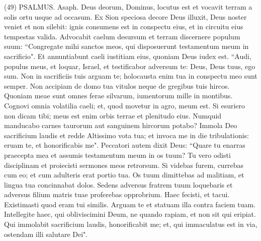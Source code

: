 \begin{biblechapter}  (49) 
\verse  PSALMUS. Asaph. Deus deorum, Dominus, locutus est et vocavit terram a solis ortu usque ad occasum. 
\verse Ex Sion speciosa decore Deus illuxit, 
\verse Deus noster veniet et non silebit: ignis consumens est in conspectu eius, et in circuitu eius tempestas valida. 
\verse Advocabit caelum desursum et terram discernere populum suum: 
\verse “Congregate mihi sanctos meos, qui disposuerunt testamentum meum in sacrificio". 
\verse Et annuntiabunt caeli iustitiam eius, quoniam Deus iudex est. 
\verse “Audi, populus meus, et loquar, Israel, et testificabor adversum te: Deus, Deus tuus, ego sum. 
\verse Non in sacrificiis tuis arguam te; holocausta enim tua in conspectu meo sunt semper. 
\verse Non accipiam de domo tua vitulos neque de gregibus tuis hircos. 
\verse Quoniam meae sunt omnes ferae silvarum, iumentorum mille in montibus. 
\verse Cognovi omnia volatilia caeli; et, quod movetur in agro, meum est. 
\verse Si esuriero non dicam tibi; meus est enim orbis terrae et plenitudo eius. 
\verse Numquid manducabo carnes taurorum aut sanguinem hircorum potabo? 
\verse Immola Deo sacrificium laudis et redde Altissimo vota tua; 
\verse et invoca me in die tribulationis: eruam te, et honorificabis me". 
\verse Peccatori autem dixit Deus: “Quare tu enarras praecepta mea et assumis testamentum meum in os tuum? 
\verse Tu vero odisti disciplinam et proiecisti sermones meos retrorsum. 
\verse Si videbas furem, currebas cum eo; et cum adulteris erat portio tua. 
\verse Os tuum dimittebas ad malitiam, et lingua tua concinnabat dolos. 
\verse Sedens adversus fratrem tuum loquebaris et adversus filium matris tuae proferebas opprobrium. 
\verse Haec fecisti, et tacui. Existimasti quod eram tui similis. Arguam te et statuam illa contra faciem tuam. 
\verse Intellegite haec, qui obliviscimini Deum, ne quando rapiam, et non sit qui eripiat. 
\verse Qui immolabit sacrificium laudis, honorificabit me; et, qui immaculatus est in via, ostendam illi salutare Dei". 
\end{biblechapter}

